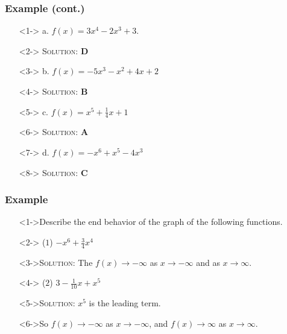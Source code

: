 \documentclass{beamer}
\begin{document}
\begin{frame}
  \frametitle{Example (cont.)}
    \begin{enumerate}
      \item[]<1-> a. $f(x)=3x^{4}-2x^{3}+3$.
      \item[]<2-> \textsc{Solution:} \textbf{D}
      \item[]<3-> b. $f(x)=-5x^{3}-x^{2}+4x+2$
      \item[]<4-> \textsc{Solution:} \textbf{B}
      \item[]<5-> c. $f(x)=x^{5}+\frac{1}{4}x+1$
      \item[]<6-> \textsc{Solution:} \textbf{A}
      \item[]<7-> d. $f(x)=-x^{6}+x^{5}-4x^{3}$
      \item[]<8-> \textsc{Solution:} \textbf{C}
    \end{enumerate}
\end{frame}

\begin{frame}
  \frametitle{Example}
  \begin{enumerate}
    \item[]<1->Describe the end behavior of the graph of the following functions.
    \item[]<2-> ($1$) $-x^{6}+\frac{3}{4}x^{4}$
    \item[]<3->\textsc{Solution:} The $f(x) \rightarrow -\infty$ as $x \rightarrow -\infty$ and as $x \rightarrow \infty$.
    \item[]<4-> ($2$) $3-\frac{1}{10}x+x^{5}$
    \item[]<5->\textsc{Solution:} $x^{5}$ is the leading term.
    \item[]<6->So $f(x) \rightarrow -\infty$ as $x \rightarrow -\infty$, and $f(x) \rightarrow \infty$ as $x \rightarrow \infty$. 
  \end{enumerate}
\end{frame}
\end{document}
